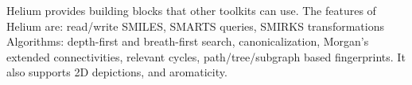 Helium provides building blocks that other toolkits can use. The features of Helium are: read/write SMILES, SMARTS queries, SMIRKS transformations Algorithms: depth-first and breath-first search, canonicalization, Morgan's extended connectivities, relevant cycles, path/tree/subgraph based fingerprints. It also supports 2D depictions, and aromaticity.
